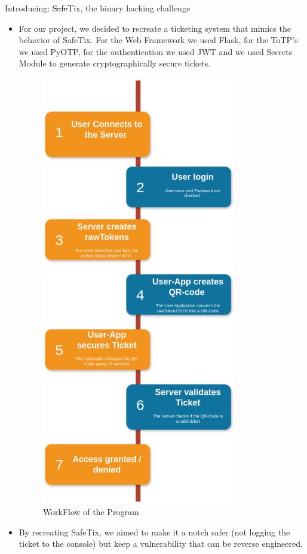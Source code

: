 \documentclass[final,dvipsnames]{beamer}
\newlength{\colwidth}
\begin{document}
\begin{frame}[t, fragile]
\begin{columns}[t]
\begin{column}{\colwidth}
\begin{block}{Introducing: \sout{Safe}Tix, the binary hacking challenge}
		\begin{itemize}
			\item For our project, we decided to recreate a ticketing system that mimics the behavior of SafeTix. 
			For the Web Framework we used Flask, for the ToTP's we used PyOTP, for the authentication we used JWT 
			and we used Secrets Module to generate cryptographically secure tickets.
			\begin{figure}[h]
				\centering
				\includegraphics[width=0.8\textwidth]{figures/WorkFlow.drawio.png}
				\caption{WorkFlow of the Program}
				\label{fig:WorkFlow}
			\end{figure}
			\item By recreating SafeTix, we aimed to make it a notch safer (not logging the ticket to the console) but keep a vulnerability that can be reverse engineered. 
		\end{itemize}


\end{block}
\end{column}
\end{columns}
\end{frame}
\end{document}
